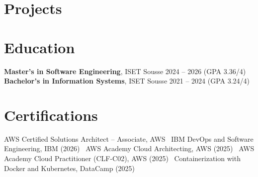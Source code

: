 \documentclass[a4paper,10pt]{article}
\begin{document}
\section*{Projects}
\pCapstone
\pCICD
\pKube
\pAWSHA
\pRobotShop

\section*{Education}
\textbf{Master's in Software Engineering}, ISET Sousse \hfill 2024 -- 2026 (GPA 3.36/4)\\
\textbf{Bachelor's in Information Systems}, ISET Sousse \hfill 2021 -- 2024 (GPA 3.24/4)

\section*{Certifications}
AWS Certified Solutions Architect -- Associate, AWS \textbar\ IBM DevOps and Software Engineering, IBM (2026) \textbar\ AWS Academy Cloud Architecting, AWS (2025) \textbar\ AWS Academy Cloud Practitioner (CLF-C02), AWS (2025) \textbar\ Containerization with Docker and Kubernetes, DataCamp (2025)
\end{document}
